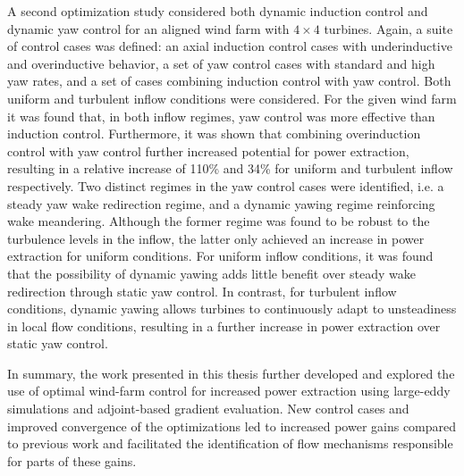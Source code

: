 A second optimization study considered both dynamic induction control and dynamic yaw control for an aligned wind farm with $4 \times 4$ turbines.
Again, a suite of control cases was defined: an axial induction control cases with underinductive and overinductive behavior, a set of yaw control cases with standard and high yaw rates, and a set of cases combining induction control with yaw control. Both uniform and turbulent inflow conditions were considered. For the given wind farm it was found that, in both inflow regimes, yaw control was more effective than induction control. Furthermore, it was shown that combining overinduction control with yaw control further increased potential for power extraction, resulting in a relative increase of 110\% and 34\% for uniform and turbulent inflow respectively. Two distinct regimes in the yaw control cases were identified, i.e. a steady yaw wake redirection regime, and a dynamic yawing regime reinforcing wake meandering. Although the former regime was found to be robust to the turbulence levels in the inflow, the latter only achieved an increase in power extraction for uniform conditions. For uniform inflow conditions, it was found that the possibility of dynamic yawing adds little benefit over steady wake redirection through static yaw control. In contrast, for turbulent inflow conditions, dynamic yawing allows turbines to continuously adapt to unsteadiness in local flow conditions, resulting in a further increase in power extraction over static yaw control. 

In summary, the work presented in this thesis further developed and explored the use of optimal wind-farm control for increased power extraction using large-eddy simulations and adjoint-based gradient evaluation. New control cases and improved convergence of the optimizations led to increased power gains compared to previous work and facilitated the identification of flow mechanisms responsible for parts of these gains. 

